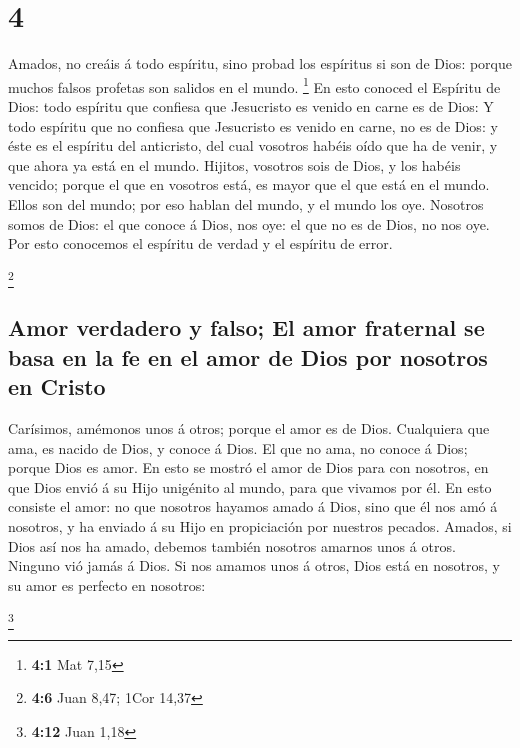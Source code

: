 \hypertarget{section-3}{%
\section{4}\label{section-3}}

 Amados, no creáis á todo espíritu, sino probad los
espíritus si son de Dios: porque muchos falsos profetas son salidos en
el mundo. \footnote{\textbf{4:1} Mat 7,15}  En esto conoced
el Espíritu de Dios: todo espíritu que confiesa que Jesucristo es venido
en carne es de Dios:  Y todo espíritu que no confiesa que
Jesucristo es venido en carne, no es de Dios: y éste es el espíritu del
anticristo, del cual vosotros habéis oído que ha de venir, y que ahora
ya está en el mundo.  Hijitos, vosotros sois de Dios, y los
habéis vencido; porque el que en vosotros está, es mayor que el que está
en el mundo.  Ellos son del mundo; por eso hablan del mundo,
y el mundo los oye.  Nosotros somos de Dios: el que conoce á
Dios, nos oye: el que no es de Dios, no nos oye. Por esto conocemos el
espíritu de verdad y el espíritu de error.

\footnote{\textbf{4:6} Juan 8,47; 1Cor 14,37}

\hypertarget{amor-verdadero-y-falso-el-amor-fraternal-se-basa-en-la-fe-en-el-amor-de-dios-por-nosotros-en-cristo}{%
\subsection{Amor verdadero y falso; El amor fraternal se basa en la fe
en el amor de Dios por nosotros en
Cristo}\label{amor-verdadero-y-falso-el-amor-fraternal-se-basa-en-la-fe-en-el-amor-de-dios-por-nosotros-en-cristo}}

 Carísimos, amémonos unos á otros; porque el amor es de
Dios. Cualquiera que ama, es nacido de Dios, y conoce á Dios.
 El que no ama, no conoce á Dios; porque Dios es amor.
 En esto se mostró el amor de Dios para con nosotros, en que
Dios envió á su Hijo unigénito al mundo, para que vivamos por él.
 En esto consiste el amor: no que nosotros hayamos amado á
Dios, sino que él nos amó á nosotros, y ha enviado á su Hijo en
propiciación por nuestros pecados.  Amados, si Dios así nos
ha amado, debemos también nosotros amarnos unos á otros. 
Ninguno vió jamás á Dios. Si nos amamos unos á otros, Dios está en
nosotros, y su amor es perfecto en nosotros:

\footnote{\textbf{4:12} Juan 1,18}

